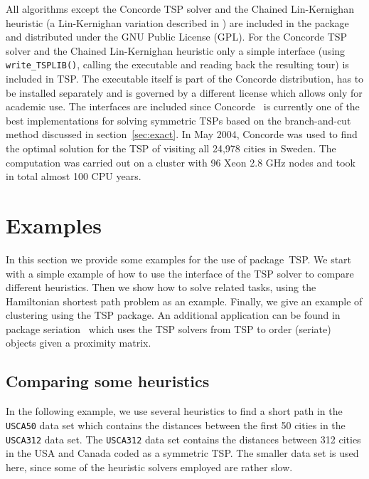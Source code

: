 \documentclass[10pt,a4paper,fleqn]{article}
\newcommand{\strong}[1]{{\normalfont\fontseries{b}\selectfont #1}}
\newcommand{\func}[1]{\mbox{\texttt{#1()}}}
\newcommand{\code}[1]{\mbox{\texttt{#1}}}
\newcommand{\pkg}[1]{\strong{#1}}
\begin{document}
All algorithms except the Concorde TSP solver and the Chained
Lin-Kernighan heuristic (a Lin-Kernighan variation described in
\cite{Applegate2003}) are included in the package and distributed under
the GNU Public License (GPL). For the Concorde TSP solver and the
Chained Lin-Kernighan heuristic only a simple interface (using
\func{write\_TSPLIB}, calling the executable and reading back the
resulting tour) is included in \pkg{TSP}.  The executable itself is part
of the Concorde distribution, has to be installed separately and is
governed by a different license which allows only for academic use.  The
interfaces are included since
Concorde~\citep{Applegate2000,Applegate2006} is currently one of the
best implementations for solving symmetric TSPs based on the
branch-and-cut method discussed in section~\ref{sec:exact}.  In May
2004, Concorde was used to find the optimal solution for the TSP of
visiting all 24,978 cities in Sweden.  The computation was carried out
on a cluster with 96 Xeon 2.8 GHz nodes and took in total almost 100 CPU
years.

\section{Examples}\label{sec:examples}

In this section we provide some examples for the use of
package~\pkg{TSP}.  We start with a simple example of how to use the
interface of the TSP solver to compare different heuristics.  Then we
show how to solve related tasks, using the Hamiltonian shortest path
problem as an example.  Finally, we give an example of clustering using
the \pkg{TSP} package.  An additional application can be found
in package \pkg{seriation}~\citep{TSP:Hahsler+Buchta+Hornik:2006} which uses
the TSP solvers from \pkg{TSP} to order (seriate) objects given a proximity
matrix.

\subsection{Comparing some heuristics}

In the following example, we use several heuristics to find a short path
in the \code{USCA50} data set which contains the distances between the
first 50 cities in the \code{USCA312} data set. The \code{USCA312} data
set contains the distances between 312 cities in the USA and Canada
coded as a symmetric TSP.  The smaller data set is used here, since some
of the heuristic solvers employed are rather slow.
\end{document}
